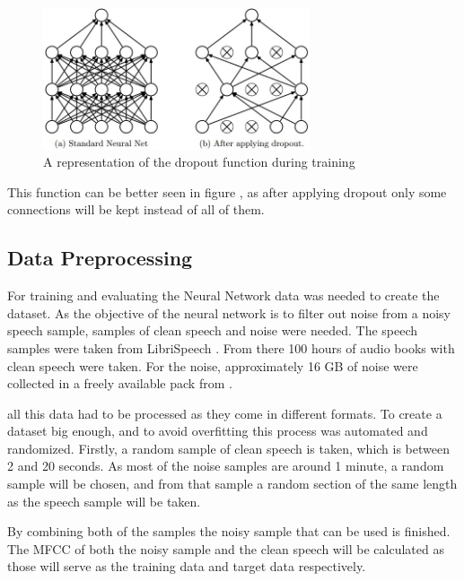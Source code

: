 \begin{figure}[htp]
	\centering
	\includegraphics[width=0.7\textwidth]{Illustrations/dropout.jpeg}
	\caption{A representation of the dropout function during training}
	\label{fig:dropout}
\end{figure}

This function can be better seen in figure , as after applying dropout only some connections will be kept instead of all of them.
\newpage
\subsection{Data Preprocessing}

For training and evaluating the Neural Network data was needed to create the dataset. As the objective of the neural network is to filter out noise from a noisy speech sample, samples of clean speech and noise were needed. The speech samples were taken from LibriSpeech . From there 100 hours of audio books with clean speech were taken.
For the noise, approximately 16 GB of noise were collected in a freely available pack from .

all this data had to be processed as they come in different formats.
To create a dataset big enough, and to avoid overfitting this process was automated and randomized. Firstly, a random sample of clean speech is taken, which is between 2 and 20 seconds. As most of the noise samples are around 1 minute, a random sample will be chosen, and from that sample a random section of the same length as the speech sample will be taken.

By combining both of the samples the noisy sample that can be used is finished.
The MFCC of both the noisy sample and the clean speech will be calculated as those will serve as the training data and target data respectively.


